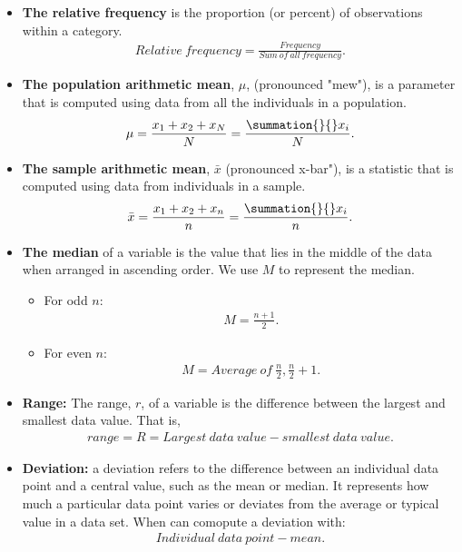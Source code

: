 \documentclass{report}
\begin{document}
        \begin{itemize}
                        \item \textbf{The relative frequency} is the proportion (or percent) of observations within a category. 
                \begin{align*}
                    Relative\ frequency = \frac{Frequency}{Sum\ of\ all\ frequency}
                .\end{align*}

                    \item \textbf{The population arithmetic mean}, $\mu$, (pronounced "mew"), is a parameter that is computed using data from all the individuals in a population.
                \begin{align*}
                    \mu = \frac{x_{1}+x_{2} + x_{N}}{N} = \frac{\summation{}{}x_{i}}{N}
                .\end{align*}
            \item \textbf{The sample arithmetic mean}, $\bar{x}$ (pronounced x-bar"), is a statistic that is computed using data from individuals in a sample.
                \begin{align*}
                    \bar{x} = \frac{x_{1}+x_{2} + x_{n}}{n} = \frac{\summation{}{}x_{i}}{n}
                .\end{align*}
            \item \textbf{The median} of a variable is the value that lies in the middle of the data when arranged in ascending order. We use $M$  to represent the median.
                \begin{itemize}
                    \item For odd $n$:
                        \begin{align*}
                            M = \frac{n+1}{2}
                        .\end{align*}
                    \item For even $n$:
                        \begin{align*}
                            M = Average\ of\ \frac{n}{2}, \frac{n}{2}+1
                        .\end{align*}
                \end{itemize}
            \item \textbf{Range:} The range, $r $, of a variable is the difference between the largest and smallest data value. That is,
                \begin{align*}
                    range = R = Largest\ data\ value- smallest\ data\ value
                .\end{align*}
            \item \textbf{Deviation:} a deviation refers to the difference between an individual data point and a central value, such as the mean or median. It represents how much a particular data point varies or deviates from the average or typical value in a data set. When can comopute a deviation with:
                \begin{align*}
                    Individual\ data\ point - mean
                .\end{align*}



\end{itemize}
\end{document}
